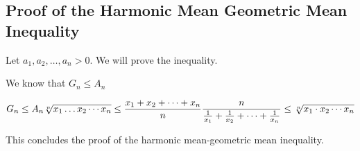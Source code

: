 \subsection{Proof of the Harmonic Mean Geometric Mean Inequality}

Let \( a_1, a_2, \dots, a_n > 0 \). We will prove the inequality.

We know that \(G_n \leq A_n \)

\begin{equation*}
		G_n \leq A_n\\
		\sqrt[n]{x_1 \dots x_2 \cdots x_n} \leq \frac{x_1 + x_2 + \cdots + x_n}{n}\\
		\frac{n}{\frac{1}{x_1} + \frac{1}{x_2} + \cdots + \frac{1}{x_n}} \leq \sqrt[n]{x_1 \cdot x_2 \cdots x_n}
\end{equation*}

This concludes the proof of the harmonic mean-geometric mean inequality.

\QED
\newpage